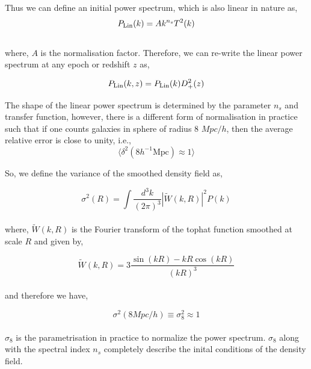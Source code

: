 Thus we can define an initial power spectrum, which is also linear in nature as,
\begin{equation}
	P_{\rm Lin}(k) = A k^{n_s} T^2(k)
\end{equation}
\\
where, $A$ is the normalisation factor. Therefore, we can re-write the linear
power spectrum at any epoch or redshift $z$ as,

\begin{equation}
	P_{\rm Lin}(k,z) = P_{\rm Lin}(k) D^2_+(z)
\end{equation}

The shape of the linear power spectrum is determined by the parameter $n_s$ and 
transfer function, however, there is a different form of normalisation in 
practice such that if one counts galaxies in sphere of radius 8 $Mpc/h$, then
the average relative error is close to unity, i.e.,
\begin{equation}
	\langle \delta^2(8 h^{-1} \mathrm{Mpc}) \approx 1 \rangle
\end{equation}

So, we define the variance of the smoothed density field as,

\begin{equation}
	\sigma^2(R) = \int \dfrac{d^3k}{(2\pi)^3} |\tilde{W}(k,R)|^2 P(k)
\end{equation}
\\
where, $\tilde{W}(k,R)$ is the Fourier transform of the tophat function smoothed 
at scale $R$ and given by,

\begin{equation}
	\tilde{W}(k,R) = 3\dfrac{\sin(kR) - kR \cos(kR)}{(kR)^3}
\end{equation}
\\
and therefore we have,

\begin{equation}
	\sigma^2(8 Mpc/h) \equiv \sigma_8^2 \approx 1
\end{equation}
\\
$\sigma_8$ is the parametrisation in practice to normalize the power
spectrum. $\sigma_8$ along with the spectral index $n_s$ completely
describe the inital conditions of the density field.


